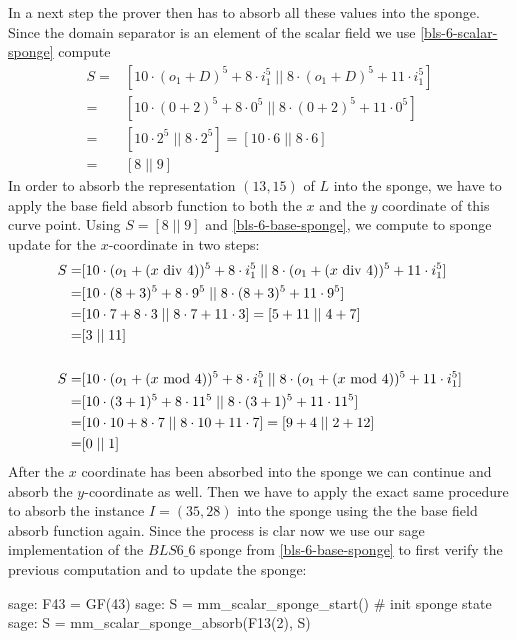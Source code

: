 \begin{example}
In a next step the prover then has to absorb all these values into the sponge. Since the domain separator is an element of the scalar field we use \ref{bls-6-scalar-sponge} compute
\begin{align*}
S = & [10\cdot (o_1+D)^5 + 8\cdot i_1^5 \;||\; 8\cdot (o_1+D)^5 + 11\cdot i_1^5] \\
  = & [10\cdot (0+2)^5 + 8\cdot 0^5 \;||\; 8\cdot (0+2)^5 + 11\cdot 0^5] \\
  = & [10\cdot 2^5 \;||\; 8\cdot 2^5]
  =  [10\cdot 6 \;||\; 8\cdot 6] \\
  = & [8 \;||\; 9]
\end{align*}  
In order to absorb the representation $(13,15)$ of $L$ into the sponge, we have to apply the base field absorb function to both the $x$ and the $y$ coordinate of this curve point. Using $S=[8 \;||\; 9]$ and \ref{bls-6-base-sponge}, we compute to sponge update for the $x$-coordinate in two steps:
\begin{align*}
S = & [10\cdot (o_1+(x \text{ div } 4))^5 + 8\cdot i_1^5 \;||\; 8\cdot (o_1+(x \text{ div } 4))^5 + 11\cdot i_1^5]\\ 
 = & [10\cdot (8+3)^5 + 8\cdot 9^5 \;||\; 8\cdot (8+3)^5 + 11\cdot 9^5]\\ 
 = & [10\cdot 7 + 8\cdot 3 \;||\; 8\cdot 7 + 11\cdot 3]
 =  [5 + 11 \;||\; 4 + 7]\\ 
 = & [3 \;||\; 11]\\
\\
S = & [10\cdot (o_1+(x \text{ mod } 4))^5 + 8\cdot i_1^5 \;||\; 8\cdot (o_1+(x \text{ mod } 4))^5 + 11\cdot i_1^5]\\ 
  = & [10\cdot (3+1)^5 + 8\cdot 11^5 \;||\; 8\cdot (3+1)^5 + 11\cdot 11^5]\\ 
  = & [10\cdot 10 + 8\cdot 7 \;||\; 8\cdot 10 + 11\cdot 7] 
  =  [9 + 4 \;||\; 2 + 12]\\ 
  = & [0 \;||\; 1] 
\end{align*}
After the $x$ coordinate has been absorbed into the sponge we can continue and absorb the $y$-coordinate as well. Then we have to apply the exact same procedure to absorb the instance $I=(35,28)$ into the sponge using the the base field absorb function again. Since the process is clar now we use our sage implementation of the 
$BLS6\_6$ sponge from \ref{bls-6-base-sponge} to first verify the previous computation and to update the sponge:
\begin{sagecommandline}
sage: F43 = GF(43)
sage: S = mm_scalar_sponge_start() # init sponge state
sage: S = mm_scalar_sponge_absorb(F13(2), S)

\end{sagecommandline}
\end{example}
